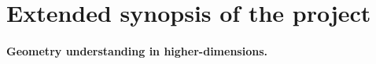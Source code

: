 \section{Extended synopsis of the project}

\paragraph{Geometry understanding in higher-dimensions.} 


